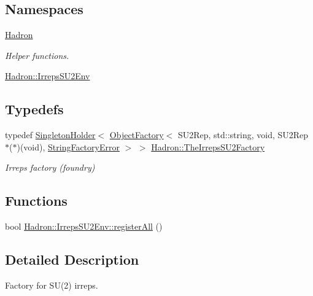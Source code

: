 \subsection*{Namespaces}
\begin{DoxyCompactItemize}
\item 
 \mbox{\hyperlink{namespaceHadron}{Hadron}}
\begin{DoxyCompactList}\small\item\em Helper functions. \end{DoxyCompactList}\item 
 \mbox{\hyperlink{namespaceHadron_1_1IrrepsSU2Env}{Hadron\+::\+Irreps\+S\+U2\+Env}}
\end{DoxyCompactItemize}
\subsection*{Typedefs}
\begin{DoxyCompactItemize}
\item 
typedef \mbox{\hyperlink{classUtil_1_1SingletonHolder}{Singleton\+Holder}}$<$ \mbox{\hyperlink{classUtil_1_1ObjectFactory}{Object\+Factory}}$<$ S\+U2\+Rep, std\+::string, void, S\+U2\+Rep $\ast$($\ast$)(void), \mbox{\hyperlink{structUtil_1_1StringFactoryError}{String\+Factory\+Error}} $>$ $>$ \mbox{\hyperlink{namespaceHadron_a48c24ae97c1fd9057ed63227b8d89834}{Hadron\+::\+The\+Irreps\+S\+U2\+Factory}}
\begin{DoxyCompactList}\small\item\em Irreps factory (foundry) \end{DoxyCompactList}\end{DoxyCompactItemize}
\subsection*{Functions}
\begin{DoxyCompactItemize}
\item 
bool \mbox{\hyperlink{namespaceHadron_1_1IrrepsSU2Env_a431c2f7d56a7ee761b4dda2bb49cfd70}{Hadron\+::\+Irreps\+S\+U2\+Env\+::register\+All}} ()
\end{DoxyCompactItemize}


\subsection{Detailed Description}
Factory for S\+U(2) irreps. 

